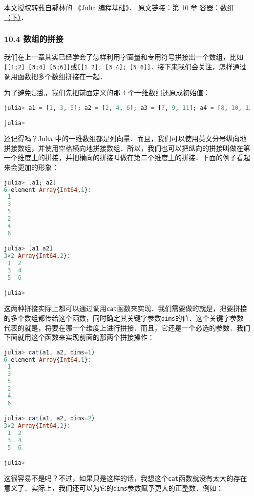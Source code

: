 
本文授权转载自郝林的 《Julia 编程基础》． 原文链接：\href{https://github.com/hyper0x/JuliaBasics/blob/master/book/ch10.md}{第 10 章 容器：数组（下）}．


\subsubsection{10.4 数组的拼接}

我们在上一章其实已经学会了怎样利用字面量和专用符号拼接出一个数组，比如\verb|[[1;2] [3;4] [5;6]]|或\verb|[[1 2]; [3 4]; [5 6]]|．接下来我们会关注，怎样通过调用函数把多个数组拼接在一起．

为了避免混乱，我们先把前面定义的那 4 个一维数组还原成初始值：

\begin{lstlisting}[language=julia]
julia> a1 = [1, 3, 5]; a2 = [2, 4, 6]; a3 = [7, 9, 11]; a4 = [8, 10, 12];

julia>
\end{lstlisting}

还记得吗？Julia 中的一维数组都是列向量．而且，我们可以使用英文分号纵向地拼接数组，并使用空格横向地拼接数组．所以，我们也可以把纵向的拼接叫做在第一个维度上的拼接，并把横向的拼接叫做在第二个维度上的拼接．下面的例子看起来会更加的形象：

\begin{lstlisting}[language=julia]
julia> [a1; a2]
6-element Array{Int64,1}:
 1
 3
 5
 2
 4
 6

julia> [a1 a2]
3×2 Array{Int64,2}:
 1  2
 3  4
 5  6

julia> 
\end{lstlisting}

这两种拼接实际上都可以通过调用\verb|cat|函数来实现．我们需要做的就是，把要拼接的多个数组都传给这个函数，同时确定其关键字参数\verb|dims|的值．这个关键字参数代表的就是，将要在哪一个维度上进行拼接．而且，它还是一个必选的参数．我们下面就用这个函数来实现前面的那两个拼接操作：

\begin{lstlisting}[language=julia]
julia> cat(a1, a2, dims=1)
6-element Array{Int64,1}:
 1
 3
 5
 2
 4
 6

julia> cat(a1, a2, dims=2)
3×2 Array{Int64,2}:
 1  2
 3  4
 5  6

julia> 
\end{lstlisting}

这很容易不是吗？不过，如果只是这样的话，我想这个\verb|cat|函数就没有太大的存在意义了．实际上，我们还可以为它的\verb|dims|参数赋予更大的正整数．例如：

